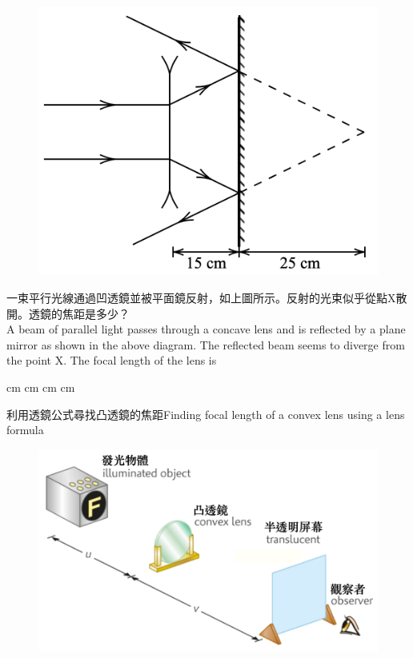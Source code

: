 \documentclass[beamer=true]{standalone}
\begin{document}
\begin{eg}
    \begin{figure}
        \centering
        \includegraphics[width=0.5\linewidth]{../../assets/n8xu1980d23x23.png}
    \end{figure}
    一束平行光線通過凹透鏡並被平面鏡反射，如上圖所示。反射的光束似乎從點X散開。透鏡的焦距是多少？\\
    A beam of parallel light passes through a concave lens and is reflected by a plane mirror as shown in the above diagram. The reflected beam seems to diverge from the point X. The focal length of the lens is
\end{eg}
\begin{eg}
    \begin{tasks}
         cm
         cm
         cm
         cm
    \end{tasks}
\end{eg}

\begin{frame}{利用透鏡公式尋找凸透鏡的焦距Finding focal length of a convex lens using a lens formula}
    \begin{figure}
        \centering
        \includegraphics[width=1\linewidth]{../../assets/xu89n32r2r2frf.png}
    \end{figure}

\end{frame}
\end{document}
